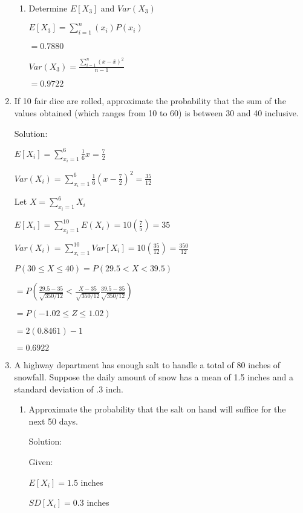 \documentclass{article}
\begin{document}
\begin{enumerate}
\begin{enumerate}
        \item Determine $E[X_3]$ and $Var(X_3)$
        
        $\displaystyle E[X_3] = \sum_{i=1}^n{(x_i)P(x_i)}$

        $= 0.7880$

        $\displaystyle Var(X_3) = \frac{\sum_{i=1}^n{(x - \bar{x})^2}}{n-1}$

        $= 0.9722$

    \end{enumerate}  
    \item If 10 fair dice are rolled, approximate the probability that the sum of the values obtained (which ranges from 10 to 60) is between 30 and 40 inclusive.
    
    Solution:

    $E[X_i] = \displaystyle \sum_{x_i = 1}^6 {\frac{1}{6}x = \frac{7}{2}}$

    $Var(X_i) = \displaystyle \sum_{x_i = 1}^6 {\frac{1}{6}{(x - \frac{7}{2})}^2 = \frac{35}{12}}$

    Let $X = \displaystyle \sum_{x_i = 1}^6 {X_i}$

    $E[X_i] = \displaystyle \sum_{x_i = 1}^{10} {E(X_i)} = 10(\frac{7}{5}) = 35$

    $Var(X_i) = \displaystyle \sum_{x_i = 1}^{10} {Var[X_i]} = 10(\frac{35}{12}) = \frac{350}{12}$

    $P(30 \leq X \leq 40) = P(29.5 < X < 39.5)$

    $= \displaystyle P\left(\frac{29.5 - 35}{\sqrt{350/12}}<\frac{X - 35}{\sqrt{350/12}}\frac{39.5 - 35}{\sqrt{350/12}}\right)$

    $= \displaystyle P\left(-1.02 \leq Z \leq 1.02 \right)$

    $= 2(0.8461)-1$

    $=0.6922$

    \item A highway department has enough salt to handle a total of 80 inches of snowfall. Suppose the daily amount of snow has a mean of 1.5 inches and a standard deviation of .3 inch.
    \begin{enumerate}
        \item Approximate the probability that the salt on hand will suffice for the next 50 days.
        
        Solution:
        
        Given:

        $E[X_i] = 1.5$ inches

        $SD[X_i] = 0.3$ inches


\end{enumerate}
\end{enumerate}
\end{document}
